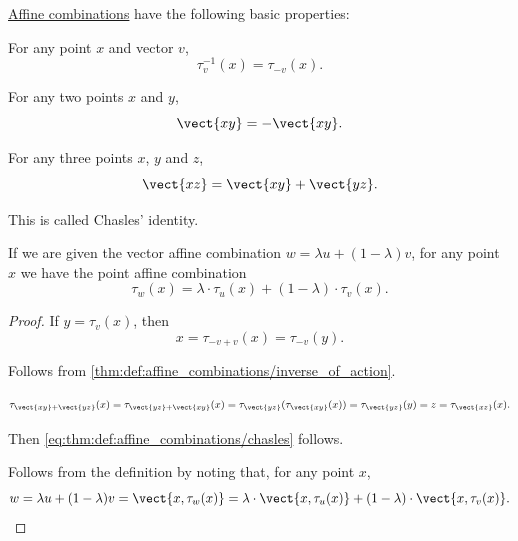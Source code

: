 \begin{proposition}\label{thm:def:affine_combinations}
  \hyperref[def:affine_combinations]{Affine combinations} have the following basic properties:
  \begin{thmenum}
     For any point \( x \) and vector \( v \),
    \begin{equation*}
      \tau_v^{-1}(x) = \tau_{-v}(x).
    \end{equation*}

     For any two points \( x \) and \( y \),
    \begin{equation*}
      \vect{xy} = -\vect{xy}.
    \end{equation*}

     For any three points \( x \), \( y \) and \( z \),
    \begin{equation}\label{eq:thm:def:affine_combinations/chasles}
      \vect{xz} = \vect{xy} + \vect{yz}.
    \end{equation}

    This is called Chasles' identity.

     If we are given the vector affine combination \( w = \lambda u + (1 - \lambda) v \), for any point \( x \) we have the point affine combination
    \begin{equation*}
      \tau_w(x) = \lambda \cdot \tau_u(x) + (1 - \lambda) \cdot \tau_v(x).
    \end{equation*}
  \end{thmenum}
\end{proposition}
\begin{proof}
   If \( y = \tau_v(x) \), then
  \begin{equation*}
    x = \tau_{-v + v}(x) = \tau_{-v}(y).
  \end{equation*}

   Follows from \cref{thm:def:affine_combinations/inverse_of_action}.

  \begin{equation*}
    \tau_{\vect{xy} + \vect{yz}}(x)
    =
    \tau_{\vect{yz} + \vect{xy}}(x)
    =
    \tau_{\vect{yz}}(\tau_{\vect{xy}}(x))
    =
    \tau_{\vect{yz}}(y)
    =
    z
    =
    \tau_{\vect{xz}}(x).
  \end{equation*}

  Then \eqref{eq:thm:def:affine_combinations/chasles} follows.

   Follows from the definition by noting that, for any point \( x \),
  \begin{equation*}
    w = \lambda u + (1 - \lambda) v
    =
    \vect{x, \tau_w(x)} = \lambda \cdot \vect{x, \tau_u(x)} + (1 - \lambda) \cdot \vect{x, \tau_v(x)}.
  \end{equation*}
\end{proof}

